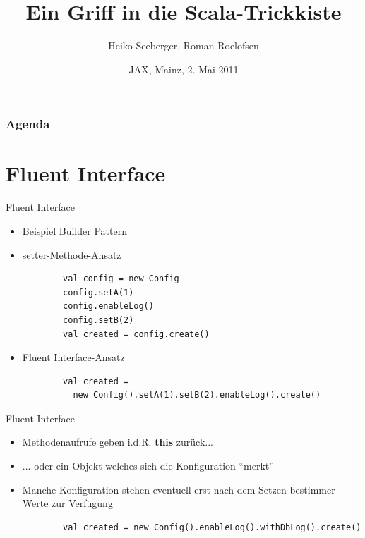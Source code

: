 \documentclass{beamer}
\title{Ein Griff in die Scala-Trickkiste}
\author{Heiko Seeberger, Roman Roelofsen}
\institute{WeigleWilczek}
\date{JAX, Mainz, 2. Mai 2011}
\begin{document}
\begin{frame}
  \titlepage
\end{frame}


\begin{frame}
  \frametitle{Agenda}
  \tableofcontents
\end{frame}


\section{Fluent Interface}

\begin{frame}[fragile]{Fluent Interface}
\begin{itemize}
	\item Beispiel Builder Pattern
	\item setter-Methode-Ansatz
	\begin{lstlisting}
		val config = new Config
		config.setA(1)
		config.enableLog()
		config.setB(2)
		val created = config.create()
	\end{lstlisting}
	\item Fluent Interface-Ansatz
	\begin{lstlisting}
		val created =
		  new Config().setA(1).setB(2).enableLog().create()
	\end{lstlisting}	
\end{itemize}
\end{frame}


\begin{frame}[fragile]{Fluent Interface}
\begin{itemize}
	\item Methodenaufrufe geben i.d.R. \textbf{this} zurück...
	\item ... oder ein Objekt welches sich die Konfiguration "`merkt"'
	\item Manche Konfiguration stehen eventuell erst nach dem Setzen bestimmer Werte zur Verfügung
	\begin{lstlisting}
		val created = new Config().enableLog().withDbLog().create()
	\end{lstlisting}
\end{itemize}
\end{frame}  
  
\end{document}
